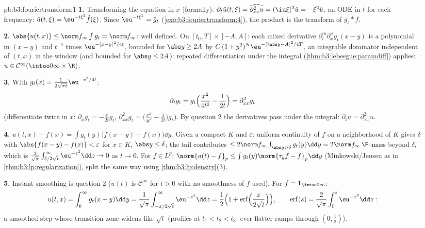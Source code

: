 \begin{solution}{pb:b3:fouriertransform:1}
\textbf{1.} Transforming the equation in $x$ (formally):
$\partial_t\hat u(t,\xi) = \widehat{\partial^2_{xx}u} =
(\iu\xi)^2\hat u = -\xi^2\hat u$, an ODE in $t$ for each
frequency: $\hat u(t,\xi) = \eu^{-t\xi^2}\hat f(\xi)$. Since
$\eu^{-t\xi^2} = \hat g_t$
(\cref{exo:b3:fouriertransform:4}), the product is the
transform of $g_t * f$.

\textbf{2.} $\abs{u(t,x)} \leq \norm f_\infty\int g_t = \norm
f_\infty$: well defined. On $[t_0, T]\times[-A, A]$: each
mixed derivative $\partial^m_t\partial^n_xg_t(x - y)$ is a
polynomial in $(x - y)$ and $t^{-1}$ times
$\eu^{-(x-y)^2/4t}$, bounded for $\abs y \geq 2A$ by
$C\,(1 + y^2)^N\eu^{-(\abs y - A)^2/4T}$, an integrable
dominator independent of $(t, x)$ in the window (and bounded
for $\abs y \leq 2A$): repeated differentiation under the
integral (\cref{thm:b3:lebesgue:paramdiff}) applies: $u \in
\mathcal C^\infty(\intoo0\infty\times\R)$.

\textbf{3.} With $g_t(x) = \frac1{2\sqrt{\pi
t}}\eu^{-x^2/4t}$:
\[
\partial_tg_t = g_t\Bigl(\frac{x^2}{4t^2} - \frac1{2t}\Bigr)
= \partial^2_{xx}g_t
\]
(differentiate twice in $x$: $\partial_xg_t = -\frac
x{2t}g_t$, $\partial^2_{xx}g_t = \bigl(\frac{x^2}{4t^2} -
\frac1{2t}\bigr)g_t$). By question 2 the derivatives pass
under the integral: $\partial_tu = \partial^2_{xx}u$.

\textbf{4.} $u(t,x) - f(x) = \int g_t(y)\bigl(f(x - y) -
f(x)\bigr)\dd y$. Given a compact $K$ and $\varepsilon$:
uniform continuity of $f$ on a neighborhood of $K$ gives
$\delta$ with $\abs{f(x-y) - f(x)} < \varepsilon$ for $x \in
K$, $\abs y \leq \delta$; the tail contributes $\leq 2\norm
f_\infty\int_{\abs y > \delta}g_t(y)\dd y = 2\norm
f_\infty\,\P$-mass beyond $\delta$, which is
$\frac2{\sqrt\pi}\int_{\delta/2\sqrt t}^\infty\eu^{-z^2}\dd z
\to 0$ as $t \to 0$. For $f \in L^p$: $\norm{u(t) - f}_p \leq
\int g_t(y)\norm{\tau_yf - f}_p\dd y$ (Minkowski/Jensen as in
\cref{thm:b3:lp:regularization}), split the same way using
\cref{thm:b3:lp:density}(3).

\textbf{5.} Instant smoothing is question 2 ($u(t)$ is
$\mathcal C^\infty$ for $t > 0$ with no smoothness of $f$
used). For $f = \mathbf 1_{\intoo0\infty}$:
\[
u(t, x) = \int_0^\infty g_t(x - y)\dd y
= \frac1{\sqrt\pi}\int_{-x/2\sqrt t}^{\infty}\eu^{-z^2}\dd z
= \frac12\Bigl(1 +
\operatorname{erf}\Bigl(\frac{x}{2\sqrt t}\Bigr)\Bigr),
\qquad \operatorname{erf}(s) =
\frac2{\sqrt\pi}\int_0^s\eu^{-z^2}\dd z :
\]
a smoothed step whose transition zone widens like $\sqrt t$
(profiles at $t_1 < t_2 < t_3$: ever flatter ramps through
$(0, \frac12)$).


\end{solution}
